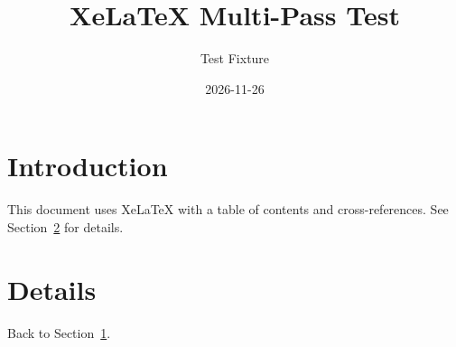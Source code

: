 \documentclass{article}
\title{XeLaTeX Multi-Pass Test}
\author{Test Fixture}
\date{2026-11-26}
\begin{document}
\maketitle
\tableofcontents

\section{Introduction}\label{sec:intro}
This document uses XeLaTeX with a table of contents and cross-references.
See Section~\ref{sec:details} for details.

\section{Details}\label{sec:details}
Back to Section~\ref{sec:intro}.
\end{document}
